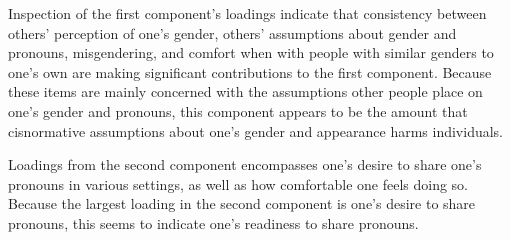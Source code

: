 \documentclass[12pt,twoside]{reedthesis}
\begin{document}
Inspection of the first component's loadings indicate that consistency between others' perception of one's gender, others' assumptions about gender and pronouns, misgendering, and comfort when with people with similar genders to one's own are making significant contributions to the first component. Because these items are mainly concerned with the assumptions other people place on one's gender and pronouns, this component appears to be the amount that cisnormative assumptions about one's gender and appearance harms individuals.

Loadings from the second component encompasses one's desire to share one's pronouns in various settings, as well as how comfortable one feels doing so. Because the largest loading in the second component is one's desire to share pronouns, this seems to indicate one's readiness to share pronouns.
\end{document}
